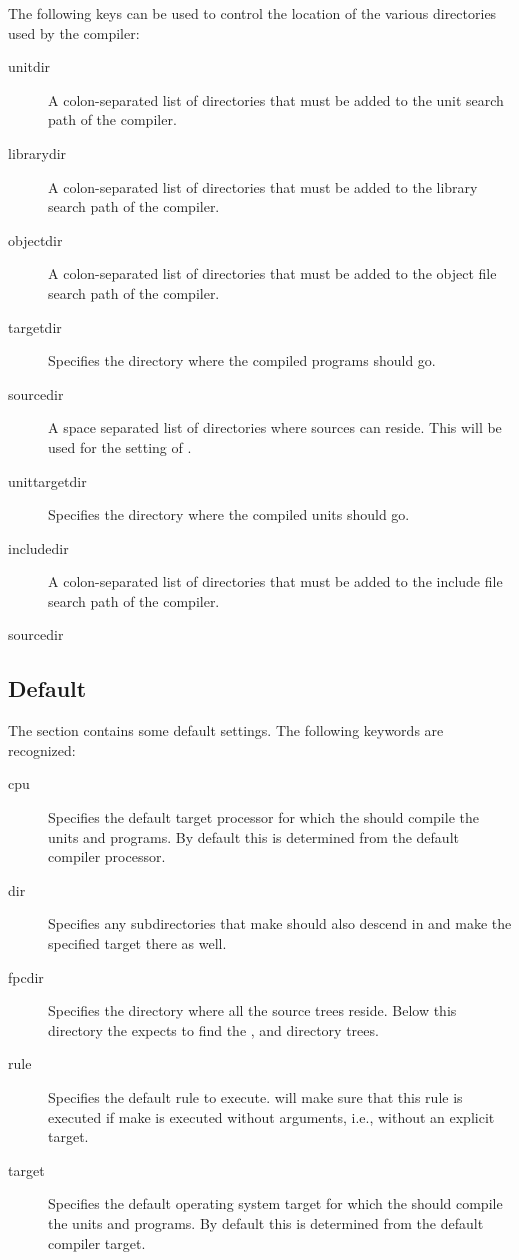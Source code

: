 {The following keys can be used to control the location of the various
directories used by the compiler:
\begin{description}
\item[unitdir]
A colon-separated list of directories that must be added to the unit
search path of the compiler.
\item[librarydir]
A colon-separated list of directories that must be added to the library
search path of the compiler.
\item[objectdir]
A colon-separated list of directories that must be added to the object file
search path of the compiler.
\item[targetdir]
Specifies the directory where the compiled programs should go.
\item[sourcedir]
A space separated list of directories where sources can reside.
This will be used for the  setting of \gnu {}.
\item[unittargetdir]
Specifies the directory where the compiled units should go.
\item[includedir]
A colon-separated list of directories that must be added to the include file
search path of the compiler.
\item[sourcedir]
\end{description}


\subsection{Default}
The  section contains some default settings. The following keywords
are recognized:
\begin{description}
\item[cpu]
Specifies the default target processor for which the 
should compile the units and programs. By default this is determined from
the default compiler processor.
\item[dir]
Specifies any subdirectories that make should also descend in and
make the specified target there as well.
\item[fpcdir]
Specifies the directory where all the \fpc source trees reside. Below this
directory the  expects to find the ,  and
 directory trees.
\item[rule] Specifies the default rule to execute. \fpcmake{}
will make sure that this rule is executed if make is executed without
arguments, i.e., without an explicit target.
\item[target]
Specifies the default operating system target for which the 
should compile the units and programs. By default this is determined from
the default compiler target.
\end{description}

}
